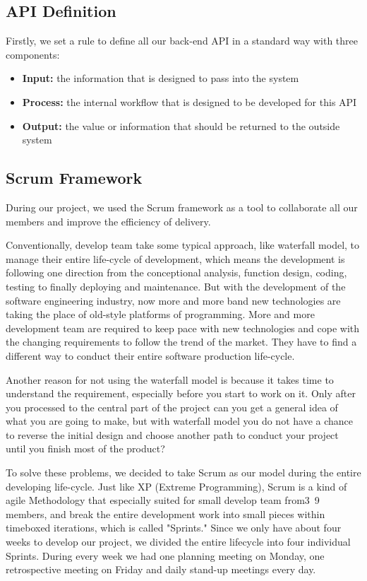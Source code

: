 \documentclass[runningheads]{llncs}
\begin{document}
\subsection{API Definition}
Firstly, we set a rule to define all our back-end API in a standard way with three components:
\begin{itemize}
	\item \textbf{Input:} the information that is designed to pass into the system
	\item \textbf{Process:} the internal workflow that is designed to be developed for this API
	\item \textbf{Output:} the value or information that should be returned to the outside system
\end{itemize}

\subsection{Scrum Framework}
During our project, we used the Scrum framework as a tool to collaborate all our members and improve the efficiency of delivery.

Conventionally, develop team take some typical approach, like waterfall model, to manage their entire life-cycle of development, which means the development is following one direction from the conceptional analysis, function design, coding, testing to finally deploying and maintenance. But with the development of the software engineering industry, now more and more band new technologies are taking the place of old-style platforms of programming. More and more development team are required to keep pace with new technologies and cope with the changing requirements to follow the trend of the market. They have to find a different way to conduct their entire software production life-cycle.

Another reason for not using the waterfall model is because it takes time to understand the requirement, especially before you start to work on it. Only after you processed to the central part of the project can you get a general idea of what you are going to make, but with waterfall model you do not have a chance to reverse the initial design and choose another path to conduct your project until you finish most of the product?

To solve these problems, we decided to take Scrum as our model during the entire developing life-cycle. Just like XP (Extreme Programming), Scrum is a kind of agile Methodology that especially suited for small develop team from3~9 members, and break the entire development work into small pieces within timeboxed iterations, which is called "Sprints." Since we only have about four weeks to develop our project, we divided the entire lifecycle into four individual Sprints. During every week we had one planning meeting on Monday, one retrospective meeting on Friday and daily stand-up meetings every day.
\end{document}
